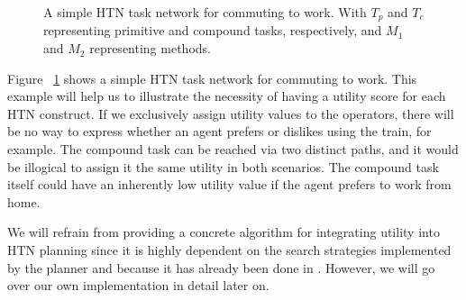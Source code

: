 \begin{figure}[H]
    \centering
    \caption{A simple HTN task network for commuting to work. With $T_p$ and $T_c$ representing primitive and compound tasks, respectively, and $M_1$ and $M_2$ representing methods.}
    \label{fig:commute_to_work}
\end{figure}
Figure ~\ref{fig:commute_to_work} shows a simple HTN task network for commuting to work. This example will help us to illustrate the necessity of having a utility score for each HTN construct. If we exclusively assign utility values to the operators, there will be no way to express whether an agent prefers or dislikes using the train, for example. The compound task  can be reached via two distinct paths, and it would be illogical to assign it the same utility in both scenarios. The compound task  itself could have an inherently low utility value if the agent prefers to work from home.

We will refrain from providing a concrete algorithm for integrating utility into HTN planning since it is highly dependent on the search strategies implemented by the planner and because it has already been done in \cite{alnazer2019htn} \cite{georgievski2014utility} \cite{alnazer2022risk}. However, we will go over our own implementation in detail later on.


